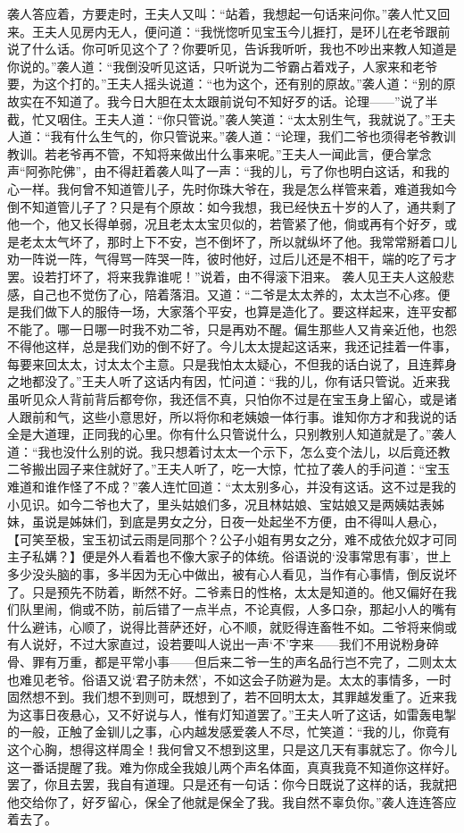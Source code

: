 \documentclass[12pt,oneside]{book}
\begin{document}
袭人答应着，方要走时，王夫人又叫：“站着，我想起一句话来问你。”袭人忙又回来。王夫人见房内无人，便问道：“我恍惚听见宝玉今儿捱打，是环儿在老爷跟前说了什么话。你可听见这个了？你要听见，告诉我听听，我也不吵出来教人知道是你说的。”袭人道：“我倒没听见这话，只听说为二爷霸占着戏子，人家来和老爷要，为这个打的。”王夫人摇头说道：“也为这个，还有别的原故。”袭人道：“别的原故实在不知道了。我今日大胆在太太跟前说句不知好歹的话。论理——”说了半截，忙又咽住。王夫人道：“你只管说。”袭人笑道：“太太别生气，我就说了。”王夫人道：“我有什么生气的，你只管说来。”袭人道：“论理，我们二爷也须得老爷教训教训。若老爷再不管，不知将来做出什么事来呢。”王夫人一闻此言，便合掌念声“阿弥陀佛”，由不得赶着袭人叫了一声：“我的儿，亏了你也明白这话，和我的心一样。我何曾不知道管儿子，先时你珠大爷在，我是怎么样管来着，难道我如今倒不知道管儿子了？只是有个原故：如今我想，我已经快五十岁的人了，通共剩了他一个，他又长得单弱，况且老太太宝贝似的，若管紧了他，倘或再有个好歹，或是老太太气坏了，那时上下不安，岂不倒坏了，所以就纵坏了他。我常常掰着口儿劝一阵说一阵，气得骂一阵哭一阵，彼时他好，过后儿还是不相干，端的吃了亏才罢。设若打坏了，将来我靠谁呢！”说着，由不得滚下泪来。
袭人见王夫人这般悲感，自己也不觉伤了心，陪着落泪。又道：“二爷是太太养的，太太岂不心疼。便是我们做下人的服侍一场，大家落个平安，也算是造化了。要这样起来，连平安都不能了。哪一日哪一时我不劝二爷，只是再劝不醒。偏生那些人又肯亲近他，也怨不得他这样，总是我们劝的倒不好了。今儿太太提起这话来，我还记挂着一件事，每要来回太太，讨太太个主意。只是我怕太太疑心，不但我的话白说了，且连葬身之地都没了。”王夫人听了这话内有因，忙问道：“我的儿，你有话只管说。近来我虽听见众人背前背后都夸你，我还信不真，只怕你不过是在宝玉身上留心，或是诸人跟前和气，这些小意思好，所以将你和老姨娘一体行事。谁知你方才和我说的话全是大道理，正同我的心里。你有什么只管说什么，只别教别人知道就是了。”袭人道：“我也没什么别的说。我只想着讨太太一个示下，怎么变个法儿，以后竟还教二爷搬出园子来住就好了。”王夫人听了，吃一大惊，忙拉了袭人的手问道：“宝玉难道和谁作怪了不成？”袭人连忙回道：“太太别多心，并没有这话。这不过是我的小见识。如今二爷也大了，里头姑娘们多，况且林姑娘、宝姑娘又是两姨姑表姊妹，虽说是姊妹们，到底是男女之分，日夜一处起坐不方便，由不得叫人悬心，【可笑至极，宝玉初试云雨是同那个？公子小姐有男女之分，难不成依允奴才可同主子私媾？】便是外人看着也不像大家子的体统。俗语说的‘没事常思有事’，世上多少没头脑的事，多半因为无心中做出，被有心人看见，当作有心事情，倒反说坏了。只是预先不防着，断然不好。二爷素日的性格，太太是知道的。他又偏好在我们队里闹，倘或不防，前后错了一点半点，不论真假，人多口杂，那起小人的嘴有什么避讳，心顺了，说得比菩萨还好，心不顺，就贬得连畜牲不如。二爷将来倘或有人说好，不过大家直过，设若要叫人说出一声‘不’字来——我们不用说粉身碎骨、罪有万重，都是平常小事——但后来二爷一生的声名品行岂不完了，二则太太也难见老爷。俗语又说‘君子防未然’，不如这会子防避为是。太太的事情多，一时固然想不到。我们想不到则可，既想到了，若不回明太太，其罪越发重了。近来我为这事日夜悬心，又不好说与人，惟有灯知道罢了。”王夫人听了这话，如雷轰电掣的一般，正触了金钏儿之事，心内越发感爱袭人不尽，忙笑道：“我的儿，你竟有这个心胸，想得这样周全！我何曾又不想到这里，只是这几天有事就忘了。你今儿这一番话提醒了我。难为你成全我娘儿两个声名体面，真真我竟不知道你这样好。罢了，你且去罢，我自有道理。只是还有一句话：你今日既说了这样的话，我就把他交给你了，好歹留心，保全了他就是保全了我。我自然不辜负你。”袭人连连答应着去了。
\end{document}
